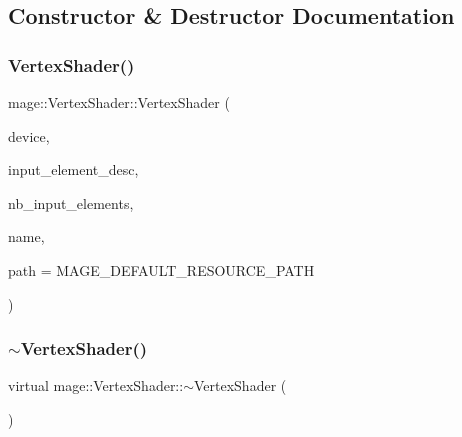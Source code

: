\subsection{Constructor \& Destructor Documentation}
\hypertarget{classmage_1_1_vertex_shader_a84be7a0ddd761b21284698441b760a81}{}\label{classmage_1_1_vertex_shader_a84be7a0ddd761b21284698441b760a81} 
\subsubsection{\texorpdfstring{Vertex\+Shader()}{VertexShader()}\hspace{0.1cm}{\footnotesize\ttfamily [1/2]}}
{\footnotesize\ttfamily mage\+::\+Vertex\+Shader\+::\+Vertex\+Shader (\begin{DoxyParamCaption}\item[{\hyperlink{namespacemage_ae74f374780900893caa5555d1031fd79}{Com\+Ptr}$<$ I\+D3\+D11\+Device2 $>$}]{device,  }\item[{const D3\+D11\+\_\+\+I\+N\+P\+U\+T\+\_\+\+E\+L\+E\+M\+E\+N\+T\+\_\+\+D\+E\+SC $\ast$}]{input\+\_\+element\+\_\+desc,  }\item[{size\+\_\+t}]{nb\+\_\+input\+\_\+elements,  }\item[{const wstring \&}]{name,  }\item[{const wstring \&}]{path = {\ttfamily MAGE\+\_\+DEFAULT\+\_\+RESOURCE\+\_\+PATH} }\end{DoxyParamCaption})}

\hypertarget{classmage_1_1_vertex_shader_a923dccd98ca878ce91ebb09c7b1cc6cb}{}\label{classmage_1_1_vertex_shader_a923dccd98ca878ce91ebb09c7b1cc6cb} 
\subsubsection{\texorpdfstring{$\sim$\+Vertex\+Shader()}{~VertexShader()}}
{\footnotesize\ttfamily virtual mage\+::\+Vertex\+Shader\+::$\sim$\+Vertex\+Shader (\begin{DoxyParamCaption}{ }\end{DoxyParamCaption})\hspace{0.3cm}{\ttfamily [virtual]}}

